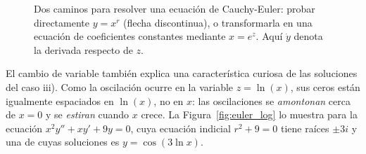 \begin{figure}[h!]
    \centering
    \caption{Dos caminos para resolver una ecuaci\'on de Cauchy-Euler: probar directamente $y=x^r$ (flecha discontinua), o transformarla en una ecuaci\'on de coeficientes constantes mediante $x=e^z$. Aqu\'i $\dot y$ denota la derivada respecto de $z$.}
    \label{fig:euler_cambio_variable}
\end{figure}

El cambio de variable tambi\'en explica una caracter\'istica curiosa de las soluciones del caso iii). Como la oscilaci\'on ocurre en la variable $z=\ln(x)$, sus ceros est\'an igualmente espaciados en $\ln(x)$, no en $x$: las oscilaciones se \emph{amontonan} cerca de $x=0$ y se \emph{estiran} cuando $x$ crece. La Figura~\ref{fig:euler_log} lo muestra para la ecuaci\'on $x^2y''+xy'+9y=0$, cuya ecuaci\'on indicial $r^2+9=0$ tiene ra\'ices $\pm3i$ y una de cuyas soluciones es $y=\cos(3\ln x)$.

